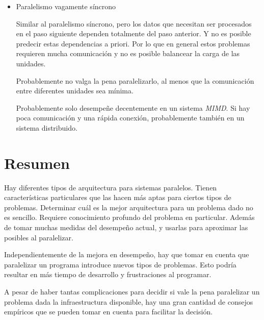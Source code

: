 \begin{itemize}
\item Paralelismo vagamente síncrono

  Similar al paralelismo síncrono, pero los datos que necesitan ser procesados
  en el paso siguiente dependen totalmente del paso anterior. Y no es posible
  predecir estas dependencias a priori. Por lo que en general estos problemas
  requieren mucha comunicación y no es posible balancear la carga de las
  unidades.

  Probablemente no valga la pena paralelizarlo, al menos que la comunicación
  entre diferentes unidades sea mínima.

  Probablemente solo desempeñe decentemente en un sistema \emph{MIMD}. Si hay
  poca comunicación y una rápida conexión, probablemente también en un sistema
  distribuido.

\end{itemize}

\section{Resumen}

Hay diferentes tipos de arquitectura para sistemas paralelos. Tienen
características particulares que las hacen más aptas para ciertos tipos de
problemas. Determinar cuál es la mejor arquitectura para un problema dado no es
sencillo. Requiere conocimiento profundo del problema en particular. Además de
tomar muchas medidas del desempeño actual, y usarlas para aproximar las
posibles al paralelizar.

Independientemente de la mejora en desempeño, hay que tomar en cuenta que
paralelizar un programa introduce nuevos tipos de problemas. Esto podría
resultar en más tiempo de desarrollo y frustraciones al programar.

A pesar de haber tantas complicaciones para decidir si vale la pena paralelizar
un problema dada la infraestructura disponible, hay una gran cantidad de
consejos empíricos que se pueden tomar en cuenta para facilitar la decisión.
